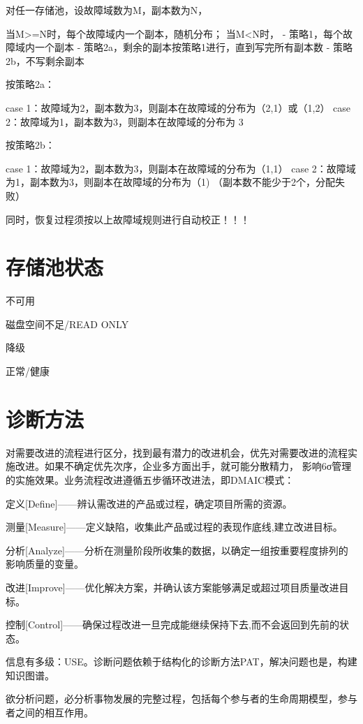 对任一存储池，设故障域数为M，副本数为N，

当M>=N时，每个故障域内一个副本，随机分布；
当M<N时，
- 策略1，每个故障域内一个副本
- 策略2a，剩余的副本按策略1进行，直到写完所有副本数
- 策略2b，不写剩余副本

按策略2a：

case 1：故障域为2，副本数为3，则副本在故障域的分布为（2,1）或（1,2）
case 2：故障域为1，副本数为3，则副本在故障域的分布为 3

按策略2b：

case 1：故障域为2，副本数为3，则副本在故障域的分布为（1,1）
case 2：故障域为1，副本数为3，则副本在故障域的分布为（1) （副本数不能少于2个，分配失败）

同时，恢复过程须按以上故障域规则进行自动校正！！！

\section{存储池状态}

\begin{compactenum}
\item 不可用
\item 磁盘空间不足/READ ONLY
\item 降级
\item 正常/健康
\end{compactenum}

\section{诊断方法}

对需要改进的流程进行区分，找到最有潜力的改进机会，优先对需要改进的流程实施改进。如果不确定优先次序，企业多方面出手，就可能分散精力，
影响6σ管理的实施效果。业务流程改进遵循五步循环改进法，即DMAIC模式：

\begin{compactenum}
\item 定义[Define]——辨认需改进的产品或过程，确定项目所需的资源。
\item 测量[Measure]——定义缺陷，收集此产品或过程的表现作底线,建立改进目标。
\item 分析[Analyze]——分析在测量阶段所收集的数据，以确定一组按重要程度排列的影响质量的变量。
\item 改进[Improve]——优化解决方案，并确认该方案能够满足或超过项目质量改进目标。
\item 控制[Control]——确保过程改进一旦完成能继续保持下去,而不会返回到先前的状态。
\end{compactenum}

信息有多级：USE。诊断问题依赖于结构化的诊断方法PAT，解决问题也是，构建知识图谱。

欲分析问题，必分析事物发展的完整过程，包括每个参与者的生命周期模型，参与者之间的相互作用。

